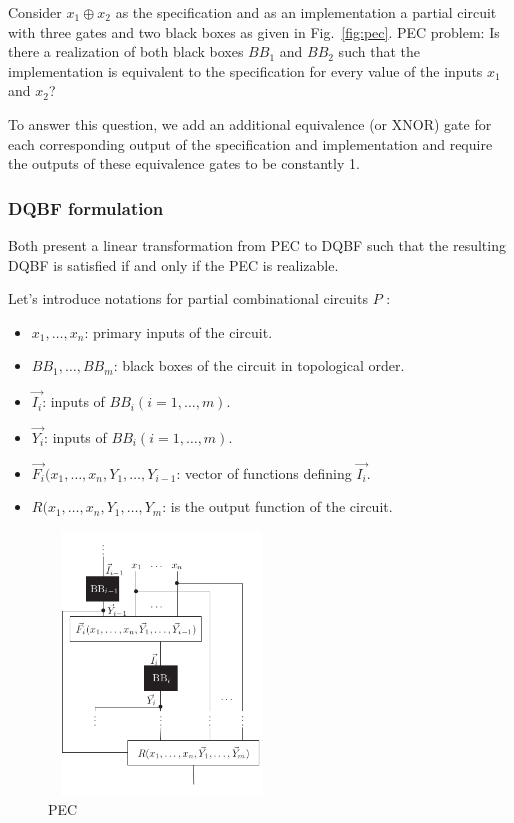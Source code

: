 \documentclass[runningheads]{llncs}
\begin{document}
\begin{example} \label{eg:dqbf}
Consider $x_1 \oplus x_2$ as the specification and as an
implementation a partial circuit with three gates and two black boxes as given in Fig.~\ref{fig:pec}.
PEC problem: Is there a realization of both black boxes $BB_1$ and $BB_2$ such that the implementation is equivalent to the specification for every value of the inputs $x_1$ and $x_2$?

To answer this question, we add an additional equivalence (or XNOR) gate for each corresponding output of the specification and implementation and require the outputs of these equivalence gates to be constantly 1.
\end{example}

\subsubsection{DQBF formulation}\label{sssec:dqbf-fml}
Both \cite{gitinarswb13, gitinarswb13r} present a linear transformation from PEC to DQBF such that the resulting DQBF is satisfied if and only if the PEC is realizable.

Let's introduce notations for partial combinational circuits $P$ :

\begin{itemize}
\item $x_1,\dots,x_n$: primary inputs of the circuit.
\item $BB_1 ,\dots, BB_m$: black boxes of the circuit in topological order.
\item $\overrightarrow{I_i}$: inputs of $BB_i (i = 1,\dots, m)$.
\item $\overrightarrow{Y_i}$: inputs of $BB_i (i = 1,\dots, m)$.
\item $\overrightarrow{F_i}(x_1,\dots, x_n, Y_1,\dots,Y_{i-1}$: vector of functions defining $\overrightarrow{I_i}$.
\item $R(x_1,\dots, x_n, Y_1,\dots,Y_{m}$: is the output function of the circuit.
\end{itemize}
\begin{figure}[]
	\includegraphics[width=6cm, height=7cm]{not}
	\centering
	\caption{PEC}\label{fig:notation}
\end{figure}
\end{document}
